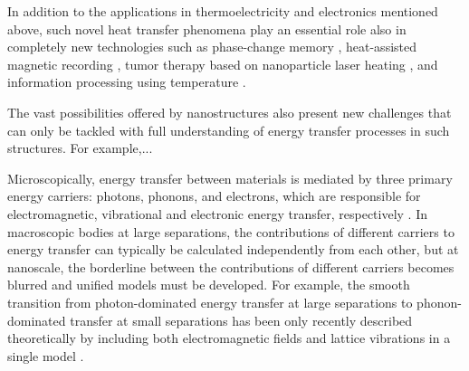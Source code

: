 In addition to the applications in thermoelectricity and electronics mentioned above, such novel heat transfer phenomena play an essential role also in completely new technologies such as phase-change memory \cite{lankhorst05}, heat-assisted magnetic recording \cite{pan09}, tumor therapy based on nanoparticle laser heating \cite{avedisian09}, and information processing using temperature \cite{li12_rmp}.  


The vast possibilities offered by nanostructures also present new challenges that can only be tackled with full understanding of energy transfer processes in such structures. For example,...


Microscopically, energy transfer between materials is mediated by three primary energy carriers: photons, phonons, and electrons, which are responsible for electromagnetic, vibrational and electronic energy transfer, respectively \cite{chen}. In macroscopic bodies at large separations, the contributions of different carriers to energy transfer can typically be calculated independently from each other, but at nanoscale, the borderline between the contributions of different carriers becomes blurred and unified models must be developed. For example, the smooth transition from photon-dominated energy transfer at large separations to phonon-dominated transfer at small separations has been only recently described theoretically by including both electromagnetic fields and lattice vibrations in a single model \cite{xiong14,chiloyan15}. 



